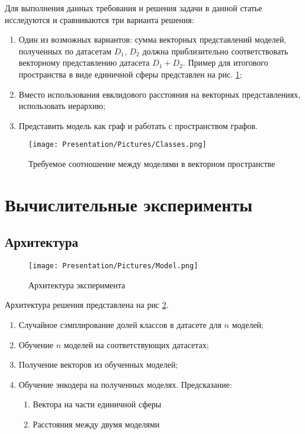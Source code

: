 \documentclass[a4paper, 14pt]{article}
\begin{document}
Для выполнения данных требования и решения задачи в данной статье исследуются и сравниваются три варианта решения:

\begin{enumerate}
    \item Один из возможных вариантов: сумма векторных представлений моделей, полученных по датасетам $D_1$, $D_2$ должна приблизительно соответствовать векторному представлению датасета $D_1 + D_2$. Пример для итогового пространства в виде единичной сферы представлен на рис. \ref{fg:classes};
    
    \item Вместо использования евклидового расстояния на векторных представлениях, использовать иерархию;
    
    \item Представить модель как граф и работать с пространством графов.
\end{enumerate}

\begin{figure}
    \begin{center}
    \texttt{[image: Presentation/Pictures/Classes.png]}
    \caption{Требуемое соотношение между моделями в векторном пространстве}
    \label{fg:classes}
    \end{center}
\end{figure}

\section{Вычислительные эксперименты}
\subsection{Архитектура}

\begin{figure}{}
    \texttt{[image: Presentation/Pictures/Model.png]}
    \caption{Архитектура эксперимента}
    \label{fg:model}
\end{figure}

Архитектура решения представлена на рис \ref{fg:model}.

\begin{enumerate}
    \item Случайное сэмплирование долей классов в датасете для $n$ моделей;

    \item Обучение $n$ моделей на соответствующих датасетах;

    \item Получение векторов из обученных моделей;

    \item Обучение энкодера на полученных моделях. Предсказание:
        \begin{enumerate}
            \item Вектора на части единичной сферы

            \item Расстояния между двумя моделями
        \end{enumerate}
\end{enumerate}
\end{document}
